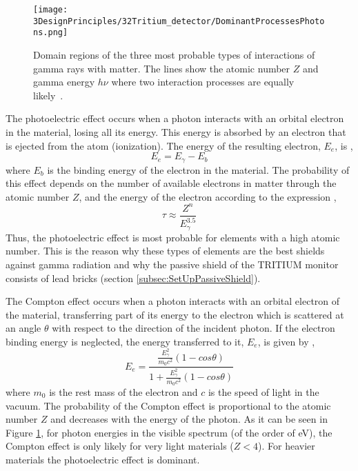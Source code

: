 \begin{figure}[h]
\centering
\texttt{[image: 3DesignPrinciples/32Tritium\_detector/DominantProcessesPhotons.png]}
\caption{Domain regions of the three most probable types of interactions of gamma rays with matter. The lines show the atomic number $Z$ and gamma energy $h\nu$ where two interaction processes are equally likely\label{fig:ProcessesPhotons}~\cite{Knoll}.}
\end{figure}

The photoelectric effect occurs when a photon interacts with an orbital electron in the material, losing all its energy. This energy is absorbed by an electron that is ejected from the atom (ionization). The energy of the resulting electron, $E_e$, is \cite{Knoll, Leo},
\begin{equation}
E_e = E_\gamma - E_b 
\label{eq:PhotoelectricEffect}
\end{equation}
where $E_b$ is the binding energy of the electron in the material. The probability of this effect depends on the number of available electrons in matter through the atomic number $Z$, and the energy of the electron according to the expression \cite{Knoll},
\begin{equation}
\tau \approx \frac{Z^n}{E_\gamma^{3.5}}
\label{eq:PhotoelectricProb}
\end{equation}
Thus, the photoelectric effect is most probable for elements with a high atomic number. This is the reason why these types of elements are the best shields against gamma radiation and why the passive shield of the TRITIUM monitor consists of lead bricks (section \ref{subsec:SetUpPassiveShield}). %

The Compton effect occurs when a photon interacts with an orbital electron of the material, transferring part of its energy to the electron which is scattered at an angle $\theta$ with respect to the direction of the incident photon. If the electron binding energy is neglected, the energy transferred to it, $E_e$, is given by \cite{Knoll, Leo},
\begin{equation}
E_e=\frac{\displaystyle{\frac{E_\gamma^2}{m_0c^2}}\left(1-cos\theta\right)}{1+ \displaystyle{\frac{E_\gamma^2}{m_0c^2}}\left(1-cos\theta\right)}
\label{eq:ComptonEffect}
\end{equation}
where $m_0$ is the rest mass of the electron and $c$ is the speed of light in the vacuum. The probability of the Compton effect is proportional to the atomic number $Z$  and decreases with the energy of the photon. As it can be seen in Figure \ref{fig:ProcessesPhotons}, for photon energies in the visible spectrum (of the order of eV), the Compton effect is only likely for very light materials ($Z<4$). For heavier materials the photoelectric effect is dominant.

